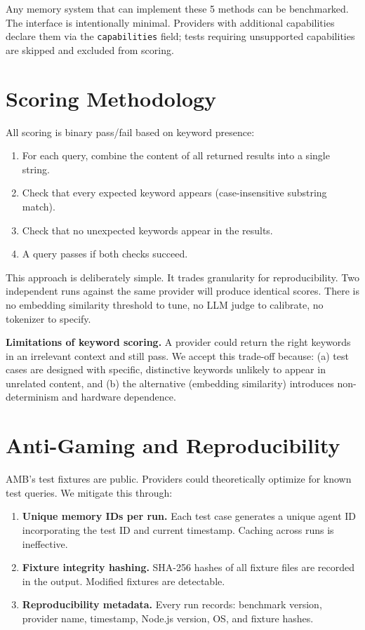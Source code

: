 \documentclass[11pt]{article}
\begin{document}
Any memory system that can implement these 5 methods can be benchmarked. The interface is intentionally minimal. Providers with additional capabilities declare them via the \texttt{capabilities} field; tests requiring unsupported capabilities are skipped and excluded from scoring.

\section{Scoring Methodology}

All scoring is binary pass/fail based on keyword presence:

\begin{enumerate}
    \item For each query, combine the content of all returned results into a single string.
    \item Check that every expected keyword appears (case-insensitive substring match).
    \item Check that no unexpected keywords appear in the results.
    \item A query passes if both checks succeed.
\end{enumerate}

This approach is deliberately simple. It trades granularity for reproducibility. Two independent runs against the same provider will produce identical scores. There is no embedding similarity threshold to tune, no LLM judge to calibrate, no tokenizer to specify.

\textbf{Limitations of keyword scoring.} A provider could return the right keywords in an irrelevant context and still pass. We accept this trade-off because: (a) test cases are designed with specific, distinctive keywords unlikely to appear in unrelated content, and (b) the alternative (embedding similarity) introduces non-determinism and hardware dependence.

\section{Anti-Gaming and Reproducibility}

AMB's test fixtures are public. Providers could theoretically optimize for known test queries. We mitigate this through:

\begin{enumerate}
    \item \textbf{Unique memory IDs per run.} Each test case generates a unique agent ID incorporating the test ID and current timestamp. Caching across runs is ineffective.
    \item \textbf{Fixture integrity hashing.} SHA-256 hashes of all fixture files are recorded in the output. Modified fixtures are detectable.
    \item \textbf{Reproducibility metadata.} Every run records: benchmark version, provider name, timestamp, Node.js version, OS, and fixture hashes.
\end{enumerate}
\end{document}
